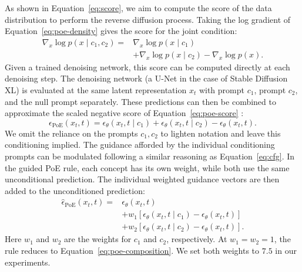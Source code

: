 \documentclass{article} %
\begin{document}
As shown in Equation~\ref{eq:score}, we aim to compute the score of the data distribution to perform the reverse diffusion process. Taking the log gradient of Equation~\ref{eq:poe-density}
gives the score for the joint condition:
\begin{equation}
\begin{aligned}
\nabla_x\log p(x\mid c_1,c_2)
={}&\nabla_x\log p(x\mid c_1)\\
&+\nabla_x\log p(x\mid c_2)
-\nabla_x\log p(x).
\end{aligned}
\label{eq:poe-score}
\end{equation}
Given a trained denoising network, this score can be computed directly at each denoising step. The denoising network (a U-Net in the case of Stable Diffusion XL) is evaluated at the same latent representation
$x_t$ with prompt $c_1$, prompt $c_2$, and the null prompt separately. These predictions can then be combined to approximate the scaled negative score of Equation~\ref{eq:poe-score} \citep{liu2022compositional}:
\begin{equation}
\epsilon_{\mathrm{PoE}}(x_t,t)
=
\epsilon_\theta(x_t,t\mid c_1)
+\epsilon_\theta(x_t,t\mid c_2)
-\epsilon_\theta(x_t,t).
\label{eq:poe-composition}
\end{equation}
We omit the reliance on the prompts $c_1,c_2$ to lighten notation and leave this conditioning implied. The guidance afforded by the individual conditioning prompts can be modulated following a similar reasoning as Equation~\ref{eq:cfg}. In the guided PoE rule, each concept has its own weight, while both
use the same unconditional prediction. The individual weighted guidance vectors are then added to the unconditioned prediction:
\begin{equation}
\begin{aligned}
\hat\epsilon_{\mathrm{PoE}}(x_t,t)
={}&\epsilon_\theta(x_t,t)\\
&+w_1\left[
  \epsilon_\theta(x_t,t\mid c_1)-\epsilon_\theta(x_t,t)
  \right]\\
&+w_2\left[
  \epsilon_\theta(x_t,t\mid c_2)-\epsilon_\theta(x_t,t)
  \right].
\end{aligned}
\label{eq:guided-poe}
\end{equation}
Here $w_1$ and $w_2$ are the weights for $c_1$ and $c_2$,
respectively. At $w_1=w_2=1$, the rule reduces to
Equation~\ref{eq:poe-composition}. We set both weights to $7.5$ in
our experiments.
\end{document}
